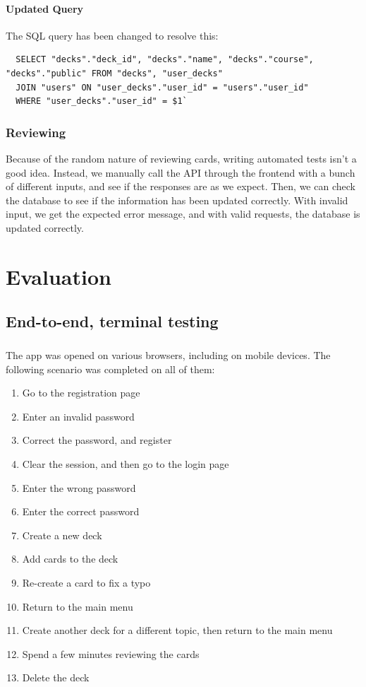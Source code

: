 \documentclass{report}
\begin{document}
\subsubsection{Updated Query}
The SQL query has been changed to resolve this:
\begin{verbatim}
  SELECT "decks"."deck_id", "decks"."name", "decks"."course", "decks"."public" FROM "decks", "user_decks"
  JOIN "users" ON "user_decks"."user_id" = "users"."user_id"
  WHERE "user_decks"."user_id" = $1`
\end{verbatim}

\subsection{Reviewing}
Because of the random nature of reviewing cards, writing automated tests isn't a good idea. Instead, we manually call the API through the frontend with a bunch of different inputs, and see if the responses are as we expect. Then, we can check the database to see if the information has been updated correctly.
With invalid input, we get the expected error message, and with valid requests, the database is updated correctly.

\chapter{Evaluation}
\section{End-to-end, terminal testing}
\paragraph{}
The app was opened on various browsers, including on mobile devices. The following scenario was completed on all of them:

\begin{enumerate}
  \item Go to the registration page
  \item Enter an invalid password
  \item Correct the password, and register
  \item Clear the session, and then go to the login page
  \item Enter the wrong password
  \item Enter the correct password
  \item Create a new deck
  \item Add cards to the deck
  \item Re-create a card to fix a typo
  \item Return to the main menu
  \item Create another deck for a different topic, then return to the main menu
  \item Spend a few minutes reviewing the cards
  \item Delete the deck
\end{enumerate}
\end{document}
